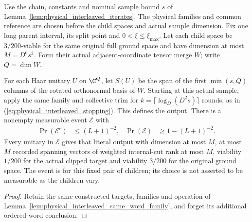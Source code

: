 \begin{lemma}
    \label{lem:physical_interleaved_node_event}
    \leanok
    Use the chain, constants and nominal sample bound $s$ of
    Lemma~\ref{lem:physical_interleaved_iterates}. The physical families
    and common reference are chosen before the child spaces and actual
    sample dimension. Fix one long parent interval, its split point and
    $0<\xi\le\xi_{\max}$. Let each child space be $3/200$-viable for
    the same original full ground space and have dimension at most
    $M=D^6s^3$. Form their actual adjacent-coordinate tensor merge $W$;
    write $Q=\dim W$.

    For each Haar unitary $U$ on $\C^Q$, let $S(U)$ be the span of the
    first $\min(s,Q)$ columns of the rotated orthonormal basis of $W$.
    Starting at this actual sample, apply the same family and collective
    trim for $k=\lceil\log_D(D^2s)\rceil$ rounds, as in
    (\ref{eq:physical_interleaved_stopping}). This defines the output.
    There is a nonempty measurable event $\mathcal E$ with
    \begin{align}
        \Pr(\mathcal E^c) & \le(L+1)^{-2},   &
        \Pr(\mathcal E)   & \ge1-(L+1)^{-2}.
        \label{eq:physical_interleaved_parent_probability}
    \end{align}
    Every unitary in $\mathcal E$ gives that literal output with
    dimension at most $M$, at most $M$ recorded spanning vectors of
    weighted internal-cut rank at most $M$, viability $1/200$ for the
    actual clipped target and viability $3/200$ for the original ground
    space. The event is for this fixed pair of children; its choice is
    not asserted to be measurable as the children vary.
\end{lemma}
\begin{proof}\leanok
    Retain the same constructed targets, families and operation of
    Lemma~\ref{lem:physical_interleaved_same_word_family}, and forget
    its additional ordered-word conclusion.
\end{proof}


